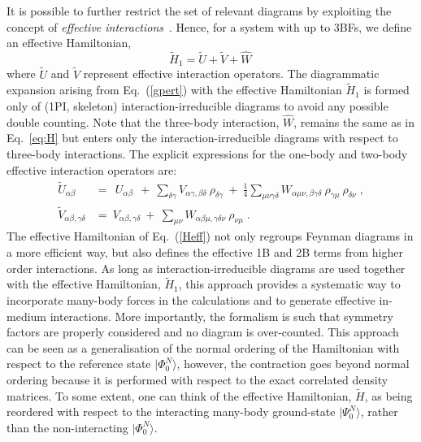 It is possible to further restrict the set of relevant diagrams by
exploiting the concept of \emph{effective interactions}~\cite{Carbone2013Nov}. Hence, for a system with up to 3BFs, we define an effective Hamiltonian,
\begin{equation}
\widetilde H_1= {\widetilde U} + {\widetilde  V} + \hat W \,
\label{Heff}
\end{equation}
where $\widetilde U$ and  $\widetilde V$ represent effective interaction operators. 
The diagrammatic expansion arising from  Eq.~(\ref{gpert}) with the effective Hamiltonian $\widetilde H_1$ is
formed only of (1PI, skeleton) interaction-irreducible diagrams to avoid any possible double counting.
Note that the three-body interaction, $\hat W$, remains the same as in Eq.~\eqref{eq:H} but enters only the 
interaction-irreducible diagrams with respect to three-body interactions.
The explicit expressions for the one-body and two-body effective interaction operators are:
\begin{align}
  \label{eq:UV_eff}
  \widetilde{U}_{\alpha\beta}&= ~ ~ U_{\alpha\beta}  ~ ~ +  ~\sum_{\delta\gamma} V_{\alpha\gamma,\beta\delta}~\rho_{\delta\gamma}
                        ~ +  ~ \frac{1}{4} \sum_{\mu \nu \gamma \delta}W_{\alpha\mu\nu,\beta\gamma\delta}~\rho_{\gamma\mu}~\rho_{\delta\nu}  \; ,
  \nonumber \\
  \widetilde{V}_{\alpha\beta,\gamma\delta} &= ~ V_{\alpha\beta,\gamma\delta}  ~+ ~ 
                          \sum_{\mu\nu}W_{\alpha\beta \mu ,\gamma \delta \nu}~\rho_{\nu\mu}  \; .
\end{align}
The effective Hamiltonian of Eq.~(\ref{Heff})  not only regroups Feynman diagrams in 
a more efficient way, but also defines the effective 1B and 2B terms from 
higher order interactions. As long as interaction-irreducible diagrams are used together with the 
effective Hamiltonian, $\widetilde{H}_1$, this approach provides a systematic
way to incorporate many-body forces in the calculations and to 
generate effective in-medium interactions. More importantly, the formalism is such that 
symmetry factors are properly considered and no diagram is over-counted. This approach can be seen as a generalisation of the normal
ordering of the Hamiltonian with respect to the reference state $\vert\Phi_0^N\rangle$, however, the contraction goes beyond normal ordering
because it is performed with respect to the exact
correlated density matrices. To some extent, one can think of 
the effective Hamiltonian, $\widetilde{H}$,  as being reordered with respect
to the interacting many-body ground-state $|\Psi_0^N\rangle$, rather than 
the non-interacting  $\vert\Phi_0^N\rangle$. 

